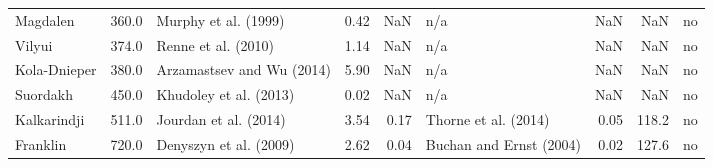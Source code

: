 \begin{tabular}{lrlrrlrrl}
            Magdalen &  360.0 &         Murphy et al. (1999) &                0.42 &                NaN &                                               n/a &               NaN &        NaN &       no \\
              Vilyui &  374.0 &          Renne et al. (2010) &                1.14 &                NaN &                                               n/a &               NaN &        NaN &       no \\
        Kola-Dnieper &  380.0 &    Arzamastsev and Wu (2014) &                5.90 &                NaN &                                               n/a &               NaN &        NaN &       no \\
            Suordakh &  450.0 &       Khudoley et al. (2013) &                0.02 &                NaN &                                               n/a &               NaN &        NaN &       no \\
         Kalkarindji &  511.0 &        Jourdan et al. (2014) &                3.54 &               0.17 &                              Thorne et al. (2014) &              0.05 &      118.2 &       no \\
            Franklin &  720.0 &       Denyszyn et al. (2009) &                2.62 &               0.04 &                           Buchan and Ernst (2004) &              0.02 &      127.6 &       no \\
\bottomrule
\end{tabular}
